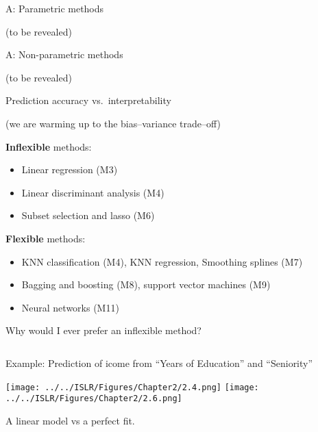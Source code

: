 \documentclass[ignorenonframetext,]{beamer}
\providecommand{\tightlist}{%
  \setlength{\itemsep}{0pt}\setlength{\parskip}{0pt}}
\begin{document}
\begin{frame}

\begin{block}{A: Parametric methods}

(to be revealed)

\end{block}

\end{frame}

\begin{frame}

\begin{block}{A: Non-parametric methods}

(to be revealed)

\end{block}

\end{frame}

\begin{frame}{Prediction accuracy vs.~interpretability}
\protect\hypertarget{prediction-accuracy-vs.interpretability}{}

(we are warming up to the bias--variance trade--off)

\textbf{Inflexible} methods:

\begin{itemize}
\tightlist
\item
  Linear regression (M3)
\item
  Linear discriminant analysis (M4)
\item
  Subset selection and lasso (M6)
\end{itemize}

\textbf{Flexible} methods:

\begin{itemize}
\tightlist
\item
  KNN classification (M4), KNN regression, Smoothing splines (M7)
\item
  Bagging and boosting (M8), support vector machines (M9)
\item
  Neural networks (M11)
\end{itemize}

\end{frame}

\begin{frame}

\begin{block}{Why would I ever prefer an inflexible method?}

\(~\)

Example: Prediction of icome from ``Years of Education'' and
``Seniority''\vspace{2mm}

\centering

\texttt{[image: ../../ISLR/Figures/Chapter2/2.4.png]}
\texttt{[image: ../../ISLR/Figures/Chapter2/2.6.png]}

A linear model vs a perfect fit.

\end{block}

\end{frame}
\end{document}
